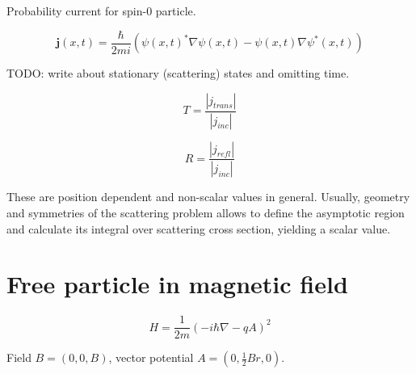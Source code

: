 \documentclass[12pt, a4paper]{article}
\begin{document}
Probability current for spin-0 particle.


$$\bm{j}(x, t) = \frac{\hbar}{2 m i} (\psi(x, t)^* \nabla \psi(x, t) - \psi(x, t) \nabla \psi^*(x, t))$$

TODO: write about stationary (scattering) states and omitting time.

$$T = \frac{|j_{trans}|}{|j_{inc}|}$$

$$R = \frac{|j_{refl}|}{|j_{inc}|}$$

These are position dependent and non-scalar values in general. Usually, geometry and symmetries of the scattering problem allows to define the asymptotic region and calculate its integral over scattering cross section, yielding a scalar value.

\section{Free particle in magnetic field}
$$H = \frac{1}{2m} (- i \hbar \nabla - q A)^2$$

Field $B = (0, 0, B)$, vector potential $A = (0, \frac{1}{2} B r, 0)$. 
\end{document}
